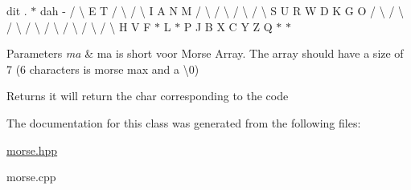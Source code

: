 dit . $\ast$ dah -\/ / \textbackslash{} E T / \textbackslash{} / \textbackslash{} I A N M / \textbackslash{} / \textbackslash{} / \textbackslash{} / \textbackslash{} S U R W D K G O / \textbackslash{} / \textbackslash{} / \textbackslash{} / \textbackslash{} / \textbackslash{} / \textbackslash{} / \textbackslash{} / \textbackslash{} H V F $\ast$ L $\ast$ P J B X C Y Z Q $\ast$ $\ast$ 
\begin{DoxyParams}{Parameters}
{\em ma} & ma is short voor Morse Array. The array should have a size of 7 (6 characters is morse max and a \textbackslash{}0) \\
\hline
\end{DoxyParams}
\begin{DoxyReturn}{Returns}
it will return the char corresponding to the code 
\end{DoxyReturn}


The documentation for this class was generated from the following files\+:\begin{DoxyCompactItemize}
\item 
\hyperlink{morse_8hpp}{morse.\+hpp}\item 
morse.\+cpp\end{DoxyCompactItemize}
